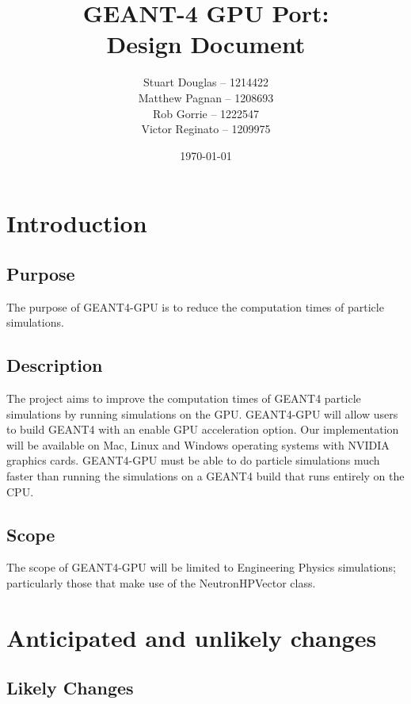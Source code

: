 \documentclass[12pt]{article}
\begin{document}
\title{
\LARGE GEANT-4 GPU Port:
\\\vspace{10mm}
\large \textbf{Design Document}
\vspace{20mm}
}
\author{
Stuart Douglas -- 1214422
\\Matthew Pagnan -- 1208693
\\Rob Gorrie -- 1222547
\\Victor Reginato -- 1209975
\vspace{10mm}
}
\date{\today}
	
\maketitle
\newpage

\tableofcontents
 
\section{Introduction}%
\subsection{Purpose}
The purpose of GEANT4-GPU is to reduce the computation times of particle simulations.
\subsection{Description}
The project aims to improve the computation times of GEANT4 particle simulations by running simulations on the GPU. GEANT4-GPU will allow users to 
build GEANT4 with an enable GPU acceleration option. Our implementation will be available on Mac, Linux and Windows operating systems with NVIDIA graphics cards. GEANT4-GPU must be able to do particle simulations much faster than running the simulations on a GEANT4 build that runs entirely on the CPU.
\subsection{Scope}
The scope of GEANT4-GPU will be limited to Engineering Physics simulations; particularly those that make use of the NeutronHPVector class.

\section{Anticipated and unlikely changes}
\subsection{Likely Changes} %
\end{document}
